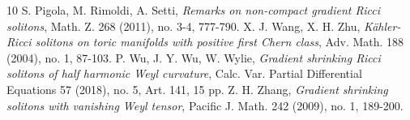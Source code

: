 \documentclass[a4, 12pt]{amsart}
\theoremstyle{plain}
\begin{document}
\begin{thebibliography}{10}
	S. Pigola, M. Rimoldi, A. Setti,   {\em Remarks on non-compact gradient Ricci solitons}, Math. Z. 268 (2011), no. 3-4, 777-790.
	X. J. Wang, X. H. Zhu, {\em K\"ahler-Ricci solitons on toric manifolds with positive first Chern class}, Adv. Math. 188 (2004), no. 1, 87-103.
	P. Wu, J. Y. Wu, W. Wylie, {\em Gradient shrinking Ricci solitons of half harmonic Weyl curvature}, Calc. Var. Partial Differential Equations 57 (2018), no. 5, Art. 141, 15 pp.
	Z. H. Zhang, {\em Gradient shrinking solitons with vanishing Weyl tensor}, Pacific J. Math. 242 (2009), no. 1, 189-200.
\end{thebibliography}
\end{document}

